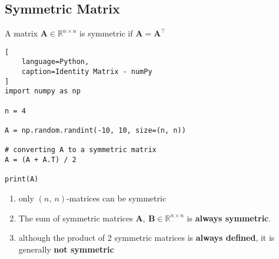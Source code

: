 \subsection{Symmetric Matrix}

A matrix $\bm{A} \in \mathbb{R}^{n\times n}$ is symmetric if $\bm{A} = \bm{A}^\top$
\hfill \cite{mfml/book/mml/Deisenroth-Faisal-Ong}


\begin{lstlisting}[
    language=Python,
    caption=Identity Matrix - numPy
]
import numpy as np

n = 4

A = np.random.randint(-10, 10, size=(n, n))

# converting A to a symmetric matrix
A = (A + A.T) / 2

print(A)
\end{lstlisting}

\begin{enumerate}
    \item only $(n,\ n)$-matrices can be symmetric
    \hfill \cite{mfml/book/mml/Deisenroth-Faisal-Ong}

    \item The sum of symmetric matrices $\bm{A},\ \bm{B} \in \mathbb{R}^{n\times n}$ is \textbf{always symmetric}. 
    \hfill \cite{mfml/book/mml/Deisenroth-Faisal-Ong}

    \item although the product of 2 symmetric matrices is \textbf{always defined}, it is generally \textbf{not symmetric}
    \hfill \cite{mfml/book/mml/Deisenroth-Faisal-Ong}
\end{enumerate}








